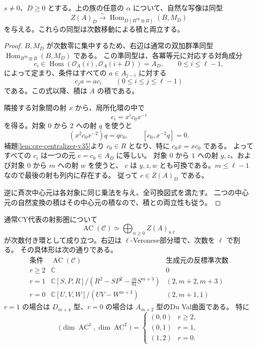 \begin{proposition}[正の移動に対する自然変換の完全計算]
\label{prop:positive-shift-center-v35}
$s\ne0$、$D\ge0$ とする。上の族の任意の $\alpha$ について、自然な写像は同型
\[
 \boxed{
 Z(A)_D\xrightarrow{\ \sim\ }
 \operatorname{Hom}_{D(B^{\mathrm{op}}\otimes B)}(B,M_D)
 }
\]
を与える。これらの同型は次数移動による積と両立する。
\end{proposition}

\begin{proof}
$B,M_D$ が次数零に集中するため、右辺は通常の双加群準同型
$\operatorname{Hom}_{B^{\mathrm{op}}\otimes B}(B,M_D)$ である。
この準同型は、各冪等元に対応する対角成分
\[
 c_i\in\operatorname{Hom}(\mathcal O_A(i),\mathcal O_A(i+D))=A_D,
 \qquad 0\le i\le\ell-1,
\]
によって定まり、条件はすべての $a\in A_{j-i}$ に対する
\[
 c_j a=a c_i\qquad(0\le i\le j\le\ell-1)
\]
である。この式以降、積は $A$ の積である。

隣接する対象間の射 $x$ から、局所化環の中で
\[
 c_i=x^ic_0x^{-i}
\]
を得る。対象 $0$ から $2$ への射 $q$ を使うと
\[
 (x^2c_0x^{-2})q=qc_0,
 \qquad [c_0,x^{-2}q]=0.
\]
補題\ref{lem:ore-centralizer-v35}より $c_0\in R$ となり、特に $c_0x=xc_0$ である。
よってすべての $c_i$ は一つの元 $c=c_0\in A_D$ に等しい。
対象 $0$ から $1$ への射 $y,z$、および対象 $0$ から $m$ への射 $w$ を使うと、
$c$ は $y,z,w$ とも可換である。$m\le\ell-1$ なので最後の射も列内に存在する。
従って $c\in Z(A)_D$ である。

逆に斉次中心元は各対象に同じ乗法を与え、全可換図式を満たす。
二つの中心元の自然変換の積はその中心元の積なので、積との両立性も従う。
\end{proof}

\begin{theorem}
\label{thm:anticanonical-ADE-v35}
通常CY代表の射影圏について
\[
 \operatorname{AC}(\mathcal C)
 \simeq\bigoplus_{n\ge0}Z(A)_{n\ell}
\]
が次数付き環として成り立つ。右辺は $\ell$-Veronese部分環で、次数を $\ell$ で割る。
その具体形は次の通りである。
\[
\begin{array}{c|c|c}
 \text{条件}&\operatorname{AC}(\mathcal C)&\text{生成元の反標準次数}\\\hline
 r\ge2&\mathbb C&0\\[1mm]
 r=1&\mathbb C[S,P,R]/(R^2-SP^2-\frac{16}{81}S^{m+3})
       &(2,m+2,m+3)\\[1mm]
 r=0&\mathbb C[U,V,W]/(UV-W^{m+3})&(2,m+1,1)
\end{array}
\]
$r=1$ の場合は $D_{m+4}$ 型、$r=0$ の場合は $A_{m+2}$ 型のDu Val曲面である。
特に
\[
 \bigl(\dim\operatorname{AC}^1,\dim\operatorname{AC}^2\bigr)
 =\begin{cases}
 (0,0)&r\ge2,\\
 (0,1)&r=1,\\
 (1,2)&r=0.
 \end{cases}
\]
\end{theorem}

